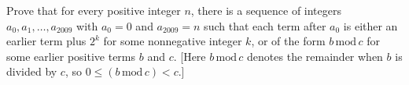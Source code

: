 Prove that for every positive integer $n$, there is a sequence of integers
$a_0, a_1, \dots, a_{2009}$ with $a_0 = 0$ and $a_{2009} = n$ such that each term
after $a_0$ is either an earlier term plus $2^k$ for some nonnegative integer $k$,
or of the form $b\,\mathrm{mod}\,c$ for some earlier positive terms $b$ and $c$.
[Here $b\,\mathrm{mod}\,c$ denotes the remainder when $b$ is divided by $c$,
so $0 \leq (b\,\mathrm{mod}\,c) < c$.]
